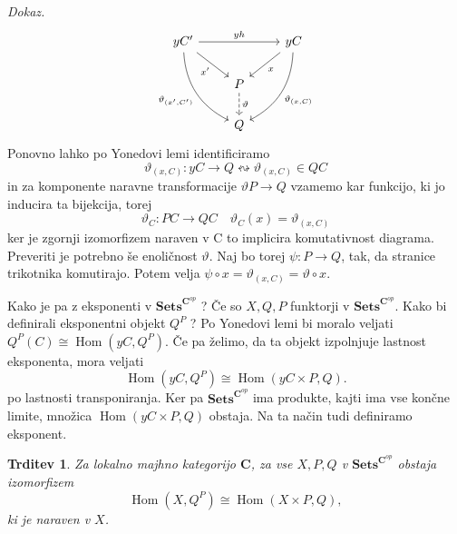 \documentclass[12pt,a4paper]{book}
\theoremstyle{definition}
\theoremstyle{plain}
\newtheorem{trditev}[definicija]{Trditev}
\newenvironment{dokaz}{\emph{Dokaz.}\ }{\hspace{\fill}{$\Box$}}
\theoremstyle{definition}
\theoremstyle{remark}
\newcommand{\cat}[1]{\textbf{#1}}
\DeclareMathOperator{\Hom}{Hom}
\newcommand{\predsnop}[1]{\cat{Sets}^{\cat{#1}^{op}}}
\begin{document}
\begin{dokaz}
$$\begin{tikzcd}
yC' \ar[rr, "yh"] \ar[ddr, bend right, "\vartheta_{(x',C')}"'] \ar[rd, "x'"'] & & yC \ar[ld, "x"] \ar[ddl, bend left, "\vartheta_{(x,C)}"] \\
& P \ar[d, dashed, "\vartheta"] & \\
& Q &
\end{tikzcd} $$
Ponovno lahko po Yonedovi lemi identificiramo 
$$\vartheta_{(x,C)}: yC \to Q \leftrightsquigarrow \vartheta_{(x,C)} \in QC$$
in za komponente naravne transformacije $\vartheta P \to Q$ vzamemo kar funkcijo, ki jo inducira ta bijekcija, torej 
$$\vartheta_C : PC \to QC \quad \vartheta_C(x) = \vartheta_{(x,C)}$$
ker je zgornji izomorfizem naraven v C to implicira komutativnost diagrama. Preveriti je potrebno še enoličnost $\vartheta$. Naj bo torej $\psi : P \to Q$, tak, da stranice trikotnika komutirajo. Potem velja $\psi \circ x = \vartheta_{(x,C)} = \vartheta \circ x$.
\end{dokaz}



Kako je pa z eksponenti v $\cat{Sets}^{\cat{C}^{op}}$ ? Če so $X,Q,P$ funktorji v $\predsnop{C}$. Kako bi definirali eksponentni objekt $Q^P$ ? Po Yonedovi lemi bi moralo veljati $Q^P(C) \cong \Hom(yC, Q^P)$. Če pa želimo, da ta objekt izpolnjuje lastnost eksponenta, mora veljati
\begin{equation} \label{eq eksp}
\Hom(yC,Q^P) \cong \Hom(yC \times P, Q).
\end{equation}
po lastnosti transponiranja. Ker pa $\predsnop{C}$ ima produkte, kajti ima vse končne limite, množica $\Hom(yC \times P, Q)$ obstaja. Na ta način tudi definiramo eksponent.

\begin{trditev} \label{trditev 3.6}
Za lokalno majhno kategorijo $\cat{C}$, za vse $X,P,Q$ v $\predsnop{C}$ obstaja izomorfizem
$$\Hom(X,Q^P) \cong \Hom(X \times P, Q),$$
ki je naraven v $X$.
\end{trditev}
\end{document}
